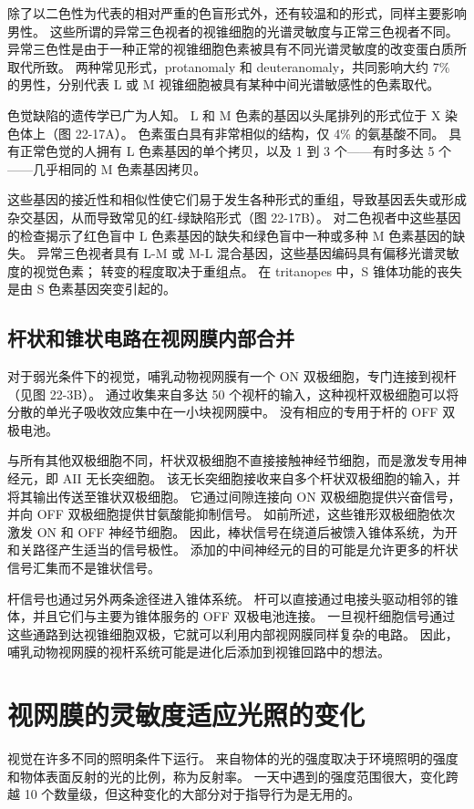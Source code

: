 除了以二色性为代表的相对严重的色盲形式外，还有较温和的形式，同样主要影响男性。 这些所谓的异常三色视者的视锥细胞的光谱灵敏度与正常三色视者不同。 异常三色性是由于一种正常的视锥细胞色素被具有不同光谱灵敏度的改变蛋白质所取代所致。 两种常见形式，protanomaly 和 deuteranomaly，共同影响大约 7\% 的男性，分别代表 L 或 M 视锥细胞被具有某种中间光谱敏感性的色素取代。

色觉缺陷的遗传学已广为人知。 L 和 M 色素的基因以头尾排列的形式位于 X 染色体上（图 22-17A）。 色素蛋白具有非常相似的结构，仅 4\% 的氨基酸不同。 具有正常色觉的人拥有 L 色素基因的单个拷贝，以及 1 到 3 个——有时多达 5 个——几乎相同的 M 色素基因拷贝。

这些基因的接近性和相似性使它们易于发生各种形式的重组，导致基因丢失或形成杂交基因，从而导致常见的红-绿缺陷形式（图 22-17B）。 对二色视者中这些基因的检查揭示了红色盲中 L 色素基因的缺失和绿色盲中一种或多种 M 色素基因的缺失。 异常三色视者具有 L-M 或 M-L 混合基因，这些基因编码具有偏移光谱灵敏度的视觉色素； 转变的程度取决于重组点。 在 tritanopes 中，S 锥体功能的丧失是由 S 色素基因突变引起的。

\subsection{杆状和锥状电路在视网膜内部合并}
对于弱光条件下的视觉，哺乳动物视网膜有一个 ON 双极细胞，专门连接到视杆（见图 22-3B）。 通过收集来自多达 50 个视杆的输入，这种视杆双极细胞可以将分散的单光子吸收效应集中在一小块视网膜中。 没有相应的专用于杆的 OFF 双极电池。

与所有其他双极细胞不同，杆状双极细胞不直接接触神经节细胞，而是激发专用神经元，即 AII 无长突细胞。 该无长突细胞接收来自多个杆状双极细胞的输入，并将其输出传送至锥状双极细胞。 它通过间隙连接向 ON 双极细胞提供兴奋信号，并向 OFF 双极细胞提供甘氨酸能抑制信号。 如前所述，这些锥形双极细胞依次激发 ON 和 OFF 神经节细胞。 因此，棒状信号在绕道后被馈入锥体系统，为开和关路径产生适当的信号极性。 添加的中间神经元的目的可能是允许更多的杆状信号汇集而不是锥状信号。

杆信号也通过另外两条途径进入锥体系统。 杆可以直接通过电接头驱动相邻的锥体，并且它们与主要为锥体服务的 OFF 双极电池连接。 一旦视杆细胞信号通过这些通路到达视锥细胞双极，它就可以利用内部视网膜同样复杂的电路。 因此，哺乳动物视网膜的视杆系统可能是进化后添加到视锥回路中的想法。


\section{视网膜的灵敏度适应光照的变化}
视觉在许多不同的照明条件下运行。 来自物体的光的强度取决于环境照明的强度和物体表面反射的光的比例，称为反射率。 一天中遇到的强度范围很大，变化跨越 10 个数量级，但这种变化的大部分对于指导行为是无用的。


